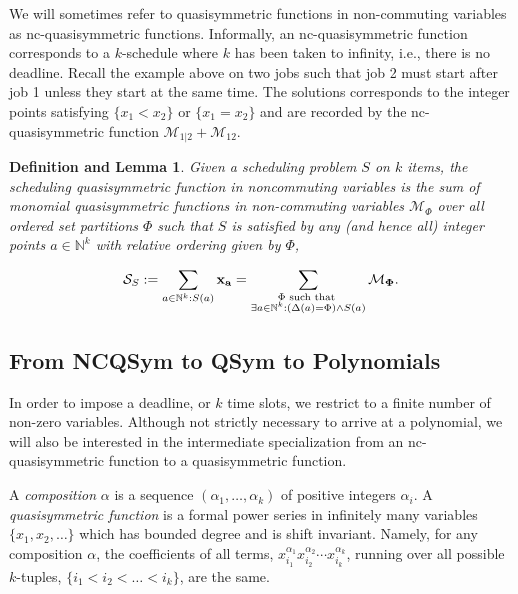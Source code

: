 \documentclass[12pt,reqno]{amsart}
\numberwithin{definition}{section}
\newtheorem{definition_lemma}[definition]{Definition and Lemma}
\theoremstyle{definition}
\newcommand{\NN}{\mathbb{N}}
\newcommand{\ncS}{\mathcal{S}}
\newcommand{\ncM}{\mathcal{M}}
\begin{document}
We will sometimes refer to quasisymmetric functions in non-commuting
variables as nc-quasisymmetric functions.  Informally, an
nc-quasisymmetric function corresponds to a $k$-schedule where $k$ has
been taken to infinity, i.e., there is no deadline.  Recall the example
above on two jobs such that job 2 must start after job 1 unless they
start at the same time.  The solutions corresponds to the integer points satisfying $\{x_1 < x_2\}$ or $\{x_1 = x_2\}$ and are recorded by the
nc-quasisymmetric function $\ncM_{1|2} + \ncM_{12}$.

\begin{definition_lemma}
\label{scheduling-ncqsym}
Given a scheduling problem $S$ on $k$ items, the scheduling quasisymmetric function in noncommuting variables is the sum of monomial quasisymmetric functions in non-commuting variables $\ncM_{\Phi}$ over all ordered set partitions ${\Phi}$ such that $S$ is satisfied by any (and hence all) integer points $a \in \mathbb{N}^k$ with relative ordering given by $\Phi$,

$$ \ncS_S := \sum_{a\in\NN^k: S(a)} \bf{x}_a = \sum_{\substack{\Phi \text{ such that } \\ \exists a\in\NN^k: (\Delta(a) =\Phi) \wedge S(a)}} \ncM_{\Phi}.  $$


\end{definition_lemma}





\subsection{From NCQSym to QSym to Polynomials}


 In order to impose a deadline, or $k$ time slots, we restrict to
 a finite number of non-zero variables.
Although not strictly necessary to arrive at a polynomial, we will also be interested in the intermediate specialization from an nc-quasisymmetric function to a quasisymmetric function.  


A \emph{composition} $\alpha$ is a sequence $(\alpha_1,\ldots,\alpha_k)$ of positive integers $\alpha_i$. A \emph{quasisymmetric function} is a formal power series in infinitely many
variables $\{x_1, x_2, \ldots \}$ which has bounded degree and is shift invariant.  Namely, for
any composition $\alpha$, the coefficients of all terms,
$x_{i_1}^{\alpha_1}x_{i_2}^{\alpha_2} \cdots x_{i_k}^{\alpha_k}$,
running over all possible $k$-tuples, $\{i_1 < i_2 < \ldots < i_k \}$, are
the same.
\end{document}
